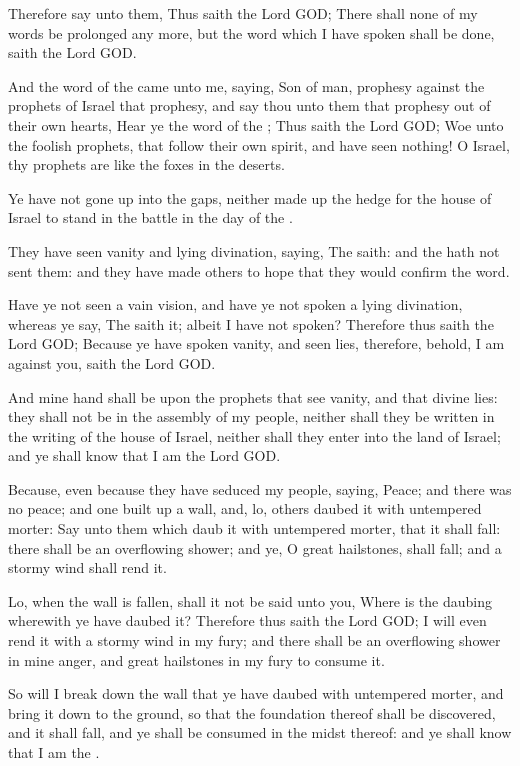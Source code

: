 \Verse Therefore say unto them, Thus saith the Lord GOD; There shall none of my words be prolonged any more, but the word which I have spoken shall be done, saith the Lord GOD.


\Chapter
\Verse And the word of the \LORD came unto me, saying, \Verse Son of man, prophesy against the prophets of Israel that prophesy, and say thou unto them that prophesy out of their own hearts, Hear ye the word of the \LORD; \Verse Thus saith the Lord GOD; Woe unto the foolish prophets, that follow their own spirit, and have seen nothing!  \Verse O Israel, thy prophets are like the foxes in the deserts.

\Verse Ye have not gone up into the gaps, neither made up the hedge for the house of Israel to stand in the battle in the day of the \LORD.

\Verse They have seen vanity and lying divination, saying, The \LORD saith: and the \LORD hath not sent them: and they have made others to hope that they would confirm the word.

\Verse Have ye not seen a vain vision, and have ye not spoken a lying divination, whereas ye say, The \LORD saith it; albeit I have not spoken?  \Verse Therefore thus saith the Lord GOD; Because ye have spoken vanity, and seen lies, therefore, behold, I am against you, saith the Lord GOD.

\Verse And mine hand shall be upon the prophets that see vanity, and that divine lies: they shall not be in the assembly of my people, neither shall they be written in the writing of the house of Israel, neither shall they enter into the land of Israel; and ye shall know that I am the Lord GOD.

\Verse Because, even because they have seduced my people, saying, Peace; and there was no peace; and one built up a wall, and, lo, others daubed it with untempered morter: \Verse Say unto them which daub it with untempered morter, that it shall fall: there shall be an overflowing shower; and ye, O great hailstones, shall fall; and a stormy wind shall rend it.

\Verse Lo, when the wall is fallen, shall it not be said unto you, Where is the daubing wherewith ye have daubed it?  \Verse Therefore thus saith the Lord GOD; I will even rend it with a stormy wind in my fury; and there shall be an overflowing shower in mine anger, and great hailstones in my fury to consume it.

\Verse So will I break down the wall that ye have daubed with untempered morter, and bring it down to the ground, so that the foundation thereof shall be discovered, and it shall fall, and ye shall be consumed in the midst thereof: and ye shall know that I am the \LORD.


